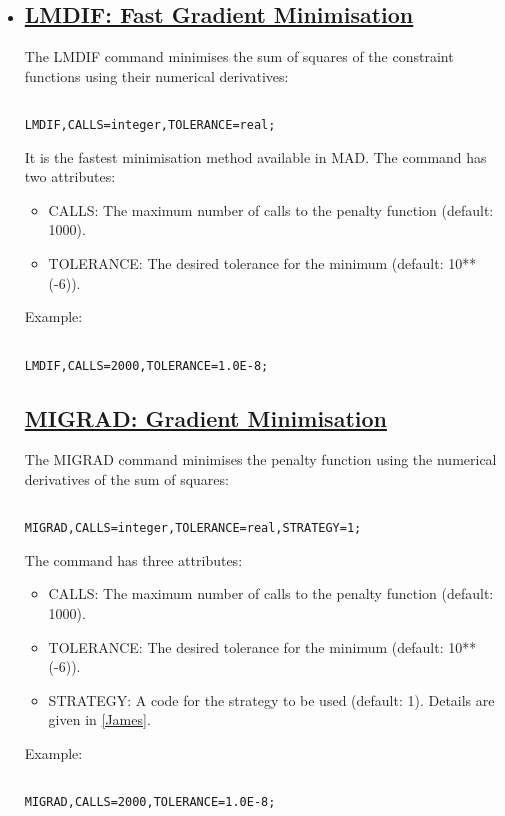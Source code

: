 \begin{itemize}
	\item 

\subsection{\href{lmdif}{LMDIF: Fast Gradient Minimisation}} The LMDIF command minimises the sum of squares of the constraint functions using their numerical derivatives: 
\begin{verbatim}

LMDIF,CALLS=integer,TOLERANCE=real;
\end{verbatim} It is the fastest minimisation method available in MAD. The command has two attributes: 
\begin{itemize}
	\item CALLS: The maximum number of calls to the penalty function (default: 1000). 
	\item TOLERANCE: The desired tolerance for the minimum (default: 10**(-6)). 
\end{itemize} Example: 
\begin{verbatim}

LMDIF,CALLS=2000,TOLERANCE=1.0E-8;
\end{verbatim}

\subsection{\href{migrad}{MIGRAD: Gradient Minimisation}} The MIGRAD command minimises the penalty function using the numerical derivatives of the sum of squares: 
\begin{verbatim}

MIGRAD,CALLS=integer,TOLERANCE=real,STRATEGY=1;
\end{verbatim} The command has three attributes: 
\begin{itemize}
	\item CALLS: The maximum number of calls to the penalty function (default: 1000). 
	\item TOLERANCE: The desired tolerance for the minimum (default: 10**(-6)). 
	\item STRATEGY: A code for the strategy to be used (default: 1). Details are given in \href{bibliography.html#minuit}{[James]}. 
\end{itemize} Example: 
\begin{verbatim}

MIGRAD,CALLS=2000,TOLERANCE=1.0E-8;
\end{verbatim}


\end{itemize}
